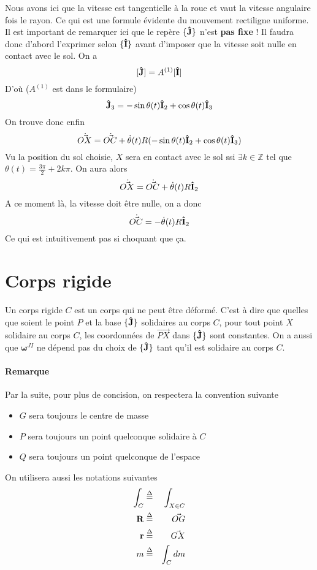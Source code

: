 \documentclass[11pt,a4paper]{article}
\newcommand\fv[1]{{\bf #1}} %
\newcommand\ui{{\bf\hat{I}}} %
\newcommand\uj{{\bf\hat{J}}} %
\newcommand\eqdef{\stackrel{\Delta}{=}}
\newcommand\omegaf{{\bm \omega}}
\newcommand\xg{\ensuremath{\fv{R}}}
\newcommand\dvec[1]{\dot{\vec{ #1}}}
\begin{document}
Nous avons ici que la vitesse est tangentielle à la roue et vaut la vitesse angulaire fois le rayon.
Ce qui est une formule évidente du mouvement rectiligne uniforme.
Il est important de remarquer ici que le repère $\{\uj\}$ n'est {\bf pas fixe} !
Il faudra donc d'abord l'exprimer selon $\{\ui\}$ avant d'imposer que la vitesse soit nulle en contact avec le sol.
On a
\[ [\uj] = A^{(1)} [\ui] \]
D'où ($A^{(1)}$ est dans le formulaire)
\[ \uj_3 = -\sin\theta(t) \ui_2 + \cos\theta(t) \ui_3 \]
On trouve donc enfin
\[ \dvec{OX} = \dvec{OC} + \dot{\theta}(t) R (-\sin\theta(t) \ui_2 + \cos\theta(t) \ui_3) \]
Vu la position du sol choisie, $X$ sera en contact avec le sol ssi $\exists k \in \mathbb{Z}$ tel que $\theta(t) = \frac{3\pi}{2} + 2k\pi$.
On aura alors
\[ \dvec{OX} = \dvec{OC} + \dot{\theta}(t) R \ui_2 \]
A ce moment là, la vitesse doit être nulle, on a donc
\[ \dvec{OC} = -\dot{\theta}(t) R \ui_2 \]
Ce qui est intuitivement pas si choquant que ça.


\section{Corps rigide}
Un corps rigide $C$ est un corps qui ne peut être déformé.
C'est à dire que quelles que soient le point $P$ et la base $\{\uj\}$ solidaires au corps $C$, pour tout point $X$ solidaire au corps $C$, les coordonnées de $\vec{PX}$ dans $\{\uj\}$ sont constantes.
On a aussi que $\omegaf^{JI}$ ne dépend pas du choix de $\{\uj\}$ tant qu'il est solidaire au corps $C$.

\paragraph{Remarque}
Par la suite, pour plus de concision, on respectera la convention suivante
\begin{itemize}
	\item $G$ sera toujours le centre de masse
	\item $P$ sera toujours un point quelconque solidaire à $C$
	\item $Q$ sera toujours un point quelconque de l'espace
\end{itemize}

On utilisera aussi les notations suivantes
\begin{eqnarray*}
	\int_C &\eqdef& \int_{X \in C}\\
	\xg &\eqdef& \vec{OG}\\
	\fv{r} &\eqdef& \vec{GX}\\
	m &\eqdef& \int_C dm
\end{eqnarray*}
\end{document}
